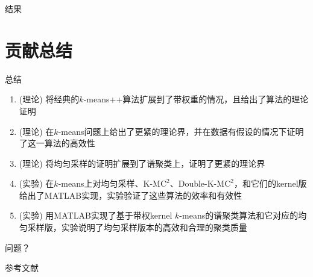 \documentclass[notheorems]{beamer}
\begin{document}
\begin{CJK*}{UTF8}{gbsn}
\begin{frame}{结果}
	
	
\end{frame}

\section{贡献总结}

\begin{frame}{总结}
	\begin{enumerate}
		\small
		\item (理论) 将经典的$k$-­means++算法扩展到了带权重的情况，且给出了算法的理论证明
		\item (理论) 在$k$-means问题上给出了更紧的理论界，并在数据有假设的情况下证明了这一算法的高效性
		\item (理论) 将均匀采样的证明扩展到了谱聚类上，证明了更紧的理论界
		\item (实验) 在$k$-means上对均匀采样、K-M$\text{C}^2$、Double-K-M$\text{C}^2$，和它们的kernel版给出了MATLAB实现，实验验证了这些算法的效率和有效性
		\item (实验) 用MATLAB实现了基于带权kernel $k$-means的谱聚类算法和它对应的均匀采样版，实验说明了均匀采样版本的高效和合理的聚类质量
	\end{enumerate}
\end{frame}

\begin{frame}[plain,c]
\begin{center}
\Huge 问题？
\end{center}
\end{frame}

\begin{frame}{参考文献}
	\scriptsize
    
    
\end{frame}

\clearpage\end{CJK*}
\end{document}
